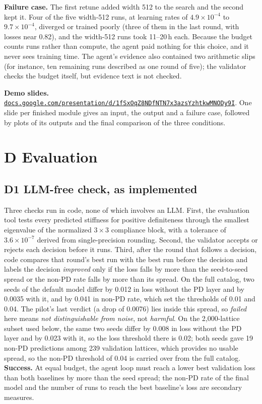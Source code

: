 \documentclass[11pt]{article}
\begin{document}
\textbf{Failure case.} The first retune added width 512 to the search and the second kept it.
Four of the five width-512 runs, at learning rates of $4.9\times10^{-4}$ to $9.7\times10^{-4}$,
diverged or trained poorly (three of them in the last round, with losses near 0.82), and the
width-512 runs took 11--20\,h each. Because the budget counts runs rather than compute, the agent
paid nothing for this choice, and it never sees training time. The agent's evidence also
contained two arithmetic slips (for instance, ten remaining runs described as one round of five);
the validator checks the budget itself, but evidence text is not checked.

\textbf{Demo slides.}
\href{https://docs.google.com/presentation/d/1fSxOqZ8NDfNTN7x3azsYzhtkwMNODy9I/edit?usp=sharing}{\nolinkurl{docs.google.com/presentation/d/1fSxOqZ8NDfNTN7x3azsYzhtkwMNODy9I}}.
One slide per finished module gives an input, the output and a failure case, followed by plots of
its outputs and the final comparison of the three conditions.

\section*{D \quad Evaluation}

\subsection*{D1 \quad LLM-free check, as implemented}
Three checks run in code, none of which involves an LLM. First, the evaluation tool tests every
predicted stiffness for positive definiteness through the smallest eigenvalue of the normalized
$3\times3$ compliance block, with a tolerance of $3.6\times10^{-7}$ derived from single-precision
rounding. Second, the validator accepts or rejects each decision before it runs. Third, after the
round that follows a decision, code compares that round's best run with the best run before the
decision and labels the decision \emph{improved} only if the loss falls by more than the
seed-to-seed spread or the non-PD rate falls by more than its spread. On the full catalog, two
seeds of the default model differ by 0.012 in loss without the PD layer and by 0.0035 with it, and
by 0.041 in non-PD rate, which set the thresholds of 0.01 and 0.04. The pilot's last verdict
(a drop of 0.0076) lies inside this spread, so \emph{failed} here means \emph{not
distinguishable from noise}, not \emph{harmful}.
On the 2,000-lattice subset used below, the same two seeds differ by 0.008 in loss without the PD
layer and by 0.023 with it, so the loss threshold there is 0.02; both seeds gave 19 non-PD
predictions among 239 validation lattices, which provides no usable spread, so the non-PD
threshold of 0.04 is carried over from the full catalog.
\textbf{Success.} At equal budget, the agent loop must reach a lower best validation loss than
both baselines by more than the seed spread; the non-PD rate of the final model and the number of
runs to reach the best baseline's loss are secondary measures.
\end{document}
